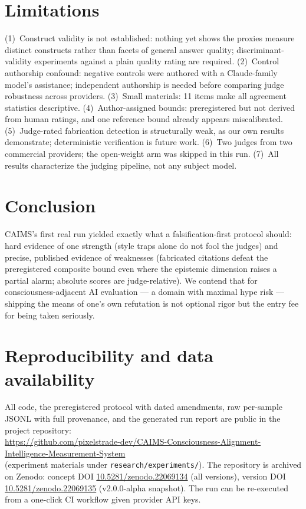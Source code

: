 \documentclass[11pt]{article}
\begin{document}
\section{Limitations}\label{sec:limits}
(1)~Construct validity is not established: nothing yet shows the proxies measure distinct constructs rather than facets of general answer quality; discriminant-validity experiments against a plain quality rating are required. (2)~Control authorship confound: negative controls were authored with a Claude-family model's assistance; independent authorship is needed before comparing judge robustness across providers. (3)~Small materials: 11 items make all agreement statistics descriptive. (4)~Author-assigned bounds: preregistered but not derived from human ratings, and one reference bound already appears miscalibrated. (5)~Judge-rated fabrication detection is structurally weak, as our own results demonstrate; deterministic verification is future work. (6)~Two judges from two commercial providers; the open-weight arm was skipped in this run. (7)~All results characterize the judging pipeline, not any subject model.

\section{Conclusion}
CAIMS's first real run yielded exactly what a falsification-first protocol should: hard evidence of one strength (style traps alone do not fool the judges) and precise, published evidence of weaknesses (fabricated citations defeat the preregistered composite bound even where the epistemic dimension raises a partial alarm; absolute scores are judge-relative). We contend that for consciousness-adjacent AI evaluation --- a domain with maximal hype risk --- shipping the means of one's own refutation is not optional rigor but the entry fee for being taken seriously.

\section*{Reproducibility and data availability}
All code, the preregistered protocol with dated amendments, raw per-sample JSONL with full provenance, and the generated run report are public in the project repository:\\
\url{https://github.com/pixelstrade-dev/CAIMS-Consciousness-Alignment-Intelligence-Measurement-System}\\
(experiment materials under \texttt{research/experiments/}). The repository is archived on Zenodo: concept DOI \href{https://doi.org/10.5281/zenodo.22069134}{10.5281/zenodo.22069134} (all versions), version DOI \href{https://doi.org/10.5281/zenodo.22069135}{10.5281/zenodo.22069135} (v2.0.0-alpha snapshot). The run can be re-executed from a one-click CI workflow given provider API keys.
\end{document}
